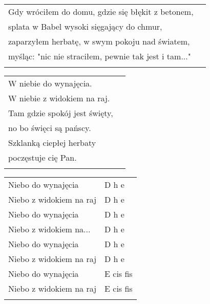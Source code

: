 \documentclass[a5paper]{article}
\begin{document}
\noindent
\begin{tabular}{@{}p{8.50cm}p{3cm}@{}}
Gdy wróciłem do domu, gdzie się błękit z betonem, \\
splata w Babel wysoki sięgający do chmur, \\
zaparzyłem herbatę, w swym pokoju nad światem, \\
myśląc: "nic nie straciłem, pewnie tak jest i tam..." \\ \\
\end{tabular}

\noindent
\begin{tabular}{@{}p{7.50cm}p{3cm}@{}}
W niebie do wynajęcia. \\
W niebie z widokiem na raj. \\
Tam gdzie spokój jest święty, \\
no bo święci są pańscy. \\
Szklanką ciepłej herbaty \\
poczęstuje cię Pan. \\ \\
\end{tabular}

\noindent
\begin{tabular}{@{}p{8.50cm}p{3cm}@{}}
Niebo do wynajęcia & D h e \\
Niebo z widokiem na raj & D h e \\
Niebo do wynajęcia & D h e \\
Niebo z widokiem na...	 & D h e \\
Niebo do wynajęcia & D h e \\
Niebo z widokiem na raj & D h e \\
Niebo do wynajęcia	& E cis fis \\
Niebo z widokiem na raj	& E cis fis \\ \\
\end{tabular}
\end{document}

